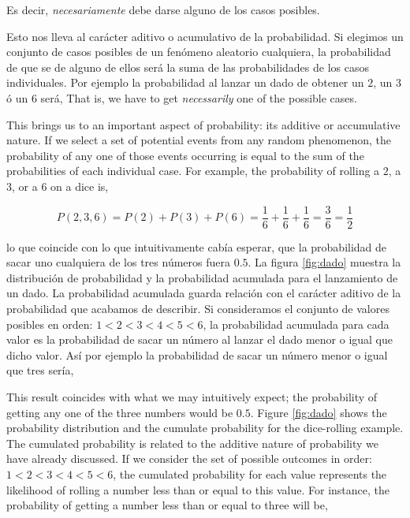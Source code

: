 \begin{paracol}{2}
Es decir, \emph{necesariamente} debe darse alguno de los casos posibles.

Esto nos lleva al carácter aditivo o acumulativo de la probabilidad. Si elegimos un conjunto de casos posibles de un fenómeno aleatorio cualquiera, la probabilidad de que se de alguno de ellos será la suma de las probabilidades de los casos individuales. Por ejemplo la probabilidad al lanzar un dado de obtener un $2$, un $3$ ó un $6$ será,
\switchcolumn
That is, we have to get \emph{necessarily} one of the possible cases.

This brings us to an important aspect of probability: its additive or accumulative nature. If we select a set of potential events from any random phenomenon, the probability of any one of those events occurring is equal to the sum of the probabilities of each individual case. For example, the probability of rolling a $2$, a $3$, or a $6$ on a dice is,
\end{paracol}
\begin{equation*}
P(2,3,6) = P(2) + P(3) + P(6) = \frac{1}{6}+\frac{1}{6}+\frac{1}{6}=\frac{3}{6} = \frac{1}{2}
\end{equation*}
\begin{paracol}{2}
lo que coincide con lo que intuitivamente cabía esperar, que la probabilidad de sacar uno cualquiera de los tres números fuera $0.5$.
La figura \ref{fig:dado} muestra la distribución de probabilidad y la probabilidad acumulada para el lanzamiento de un dado. La probabilidad acumulada guarda relación con el carácter aditivo de la probabilidad que acabamos de describir. Si consideramos el conjunto de valores posibles en orden: $1 < 2 < 3 < 4 < 5 < 6$, la probabilidad acumulada para cada valor es la probabilidad de sacar un número al lanzar el dado menor o igual que dicho valor. Así por ejemplo la probabilidad de sacar un número menor o igual que tres sería,

\switchcolumn

This result coincides with what we may intuitively expect; the probability of getting any one of the three numbers would be $0.5$.
Figure \ref{fig:dado} shows the probability distribution and the cumulate probability for the dice-rolling example. The cumulated probability is related to the additive nature of probability we have already discussed. If we consider the set of possible outcomes in order: $1 < 2 < 3 < 4 < 5 < 6$, the cumulated probability for each value represents the likelihood of rolling a number less than or equal to this value. For instance, the probability of getting a number less than or equal to three will be,
\end{paracol}
